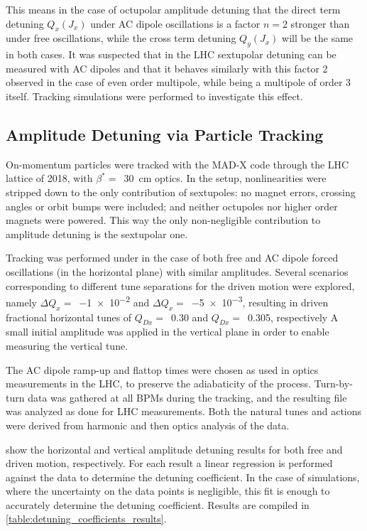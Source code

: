 This means in the case of octupolar amplitude detuning that the direct term detuning \(Q_{x}(J_{x})\) under AC dipole oscillations is a factor \(n = 2\) stronger than under free oscillations, while the cross term detuning \(Q_{y}(J_{x})\) will be the same in both cases.
It was suspected that in the LHC sextupolar detuning can be measured with AC dipoles and that it behaves similarly with this factor \num{2} observed in the case of even order multipole, while being a multipole of order \num{3} itself.
Tracking simulations were performed to investigate this effect.

\subsection*{Amplitude Detuning via Particle Tracking}

On-momentum particles were tracked with the MAD-X code through the LHC lattice of \num{2018}, with \(\beta^{\ast} =\)~\qty{30}{\centi\meter} optics.
In the setup, nonlinearities were stripped down to the only contribution of sextupoles: no magnet errors, crossing angles or orbit bumps were included; and neither octupoles nor higher order magnets were powered.
This way the only non-negligible contribution to amplitude detuning is the sextupolar one.

Tracking was performed under in the case of both free and AC dipole forced oscillations (in the horizontal plane) with similar amplitudes.
Several scenarios corresponding to different tune separations for the driven motion were explored, namely \(\Delta Q_x =\)~\num{-1e-2} and \(\Delta Q_x =\)~\num{-5e-3}, resulting in driven fractional horizontal tunes of \(Q_{Dx} =\)~\num{0.30} and \(Q_{Dx} =\)~\num{0.305}, respectively
A small initial amplitude was applied in the vertical plane in order to enable measuring the vertical tune.

The AC dipole ramp-up and flattop times were chosen as used in optics measurements in the LHC, to preserve the adiabaticity of the process.
Turn-by-turn data was gathered at all BPMs during the tracking, and the resulting file was analyzed as done for LHC measurements.
Both the natural tunes and actions were derived from harmonic and then optics analysis of the data.

 show the horizontal and vertical amplitude detuning results for both free and driven motion, respectively.
For each result a linear regression is performed against the data to determine the detuning coefficient.
In the case of simulations, where the uncertainty on the data points is negligible, this fit is enough to accurately determine the detuning coefficient.
Results are compiled in \cref{table:detuning_coefficients_results}.

